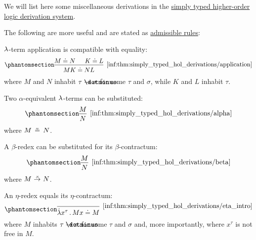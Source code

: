\begin{proposition}\label{thm:simply_typed_hol_derivations}
  We will list here some miscellaneous derivations in the \hyperref[def:simply_typed_hol_proof_tree]{simply typed higher-order logic derivation system}.

  The following are more useful and are stated as  \hyperref[con:inference_rule_admissibility]{admissible rules}:
  \begin{thmenum}[series=thm:simply_typed_hol_derivations]
     \( {\mathrm \lambda} \)-term application is compatible with equality:
    \begin{equation*}\taglabel[\ensuremath{ \logic{HOL}_{=\logic{app}} }]{inf:thm:simply_typed_hol_derivations/application}
      \begin{prooftree}
        \hypo{ M \syneq N }
        \hypo{ K \syneq L }
        \infer2[\ref{inf:thm:simply_typed_hol_derivations/application}]{ MK \syneq NL },
      \end{prooftree}
    \end{equation*}
    where \( M \) and \( N \) inhabit \( \tau \synimplies \sigma \) for some \( \tau \) and \( \sigma \), while \( K \) and \( L \) inhabit \( \tau \).

     Two \( \alpha \)-equivalent \( {\mathrm \lambda} \)-terms can be substituted:
    \begin{equation*}\taglabel[\ensuremath{ \logic{HOL}_\alpha }]{inf:thm:simply_typed_hol_derivations/alpha}
      \begin{prooftree}
        \hypo{ M }
        \infer1[\ref{inf:thm:simply_typed_hol_derivations/alpha}]{ N },
      \end{prooftree}
    \end{equation*}
    where \( M \aequiv N \).

     A \( \beta \)-redex can be substituted for its \( \beta \)-contractum:
    \begin{equation*}\taglabel[\ensuremath{ \logic{HOL}_\beta }]{inf:thm:simply_typed_hol_derivations/beta}
      \begin{prooftree}
        \hypo{ M }
        \infer1[\ref{inf:thm:simply_typed_hol_derivations/beta}]{ N },
      \end{prooftree}
    \end{equation*}
    where \( M \bred N \).

     An \( \eta \)-redex equals its \( \eta \)-contractum:
    \begin{equation*}\taglabel[\ensuremath{ \logic{HOL}_{\eta+} }]{inf:thm:simply_typed_hol_derivations/eta_intro}
      \begin{prooftree}
        \infer0[\ref{inf:thm:simply_typed_hol_derivations/eta_intro}]{ \qabs {x^\tau} M x \syneq M },
      \end{prooftree}
    \end{equation*}
    where \( M \) inhabits \( \tau \synimplies \sigma \) for some \( \tau \) and \( \sigma \) and, more importantly, where \( x^\tau \) is not free in \( M \).


\end{thmenum}
\end{proposition}
